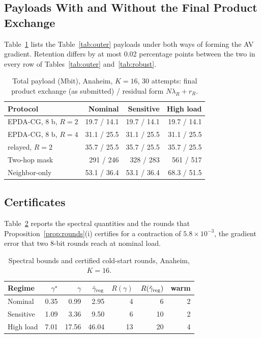 \subsection{Payloads With and Without the Final Product Exchange}
Table~\ref{tab:stepfive} lists the Table~\ref{tab:outer} payloads under both ways of forming
the AV gradient. Retention differs by at most 0.02 percentage points between the two in
every row of Tables~\ref{tab:outer} and~\ref{tab:robust}.
\begin{table}[h]
\caption{Total payload (Mbit), Anaheim, $K{=}16$, 30 attempts: final product exchange
(as submitted) / residual form $N\lambda_R+r_R$.}\label{tab:stepfive}\centering\small
\setlength{\tabcolsep}{3pt}
\begin{tabular}{lrrr}
\toprule
Protocol & Nominal & Sensitive & High load\\
\midrule
EPDA-CG, 8 b, $R{=}2$ & 19.7 / 14.1 & 19.7 / 14.1 & 19.7 / 14.1\\
EPDA-CG, 8 b, $R{=}4$ & 31.1 / 25.5 & 31.1 / 25.5 & 31.1 / 25.5\\
\quad relayed, $R{=}2$ & 35.7 / 25.5 & 35.7 / 25.5 & 35.7 / 25.5\\
Two-hop mask & 291 / 246 & 328 / 283 & 561 / 517\\
Neighbor-only & 53.1 / 36.4 & 53.1 / 36.4 & 68.3 / 51.5\\
\bottomrule
\end{tabular}
\end{table}

\subsection{Certificates}
Table~\ref{tab:cert} reports the spectral quantities and the rounds that
Proposition~\ref{prop:rounds}(i) certifies for a contraction of $5.8\times10^{-3}$, the
gradient error that two 8-bit rounds reach at nominal load.
\begin{table}[h]
\caption{Spectral bounds and certified cold-start rounds, Anaheim, $K{=}16$.}\label{tab:cert}\centering\small
\setlength{\tabcolsep}{3.5pt}
\begin{tabular}{lrrrrrr}
\toprule
Regime & $\gamma^\star$ & $\gamma$ & $\hat\gamma_{\rm reg}$ & $R(\gamma)$ & $R(\hat\gamma_{\rm reg})$ & warm\\
\midrule
Nominal & 0.35 & 0.99 & 2.95 & 4 & 6 & 2\\
Sensitive & 1.09 & 3.36 & 9.50 & 6 & 10 & 2\\
High load & 7.01 & 17.56 & 46.04 & 13 & 20 & 4\\
\bottomrule
\end{tabular}
\end{table}

